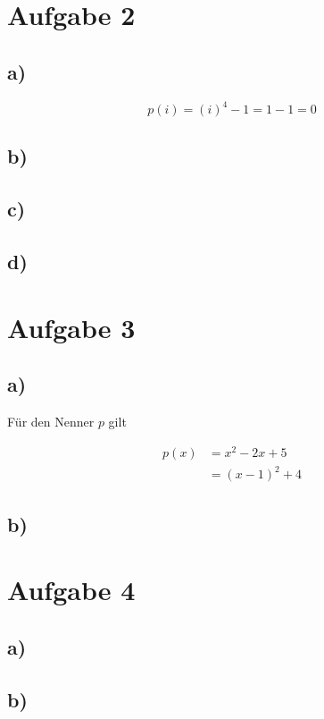 \documentclass[a4paper, 11pt]{article}
\begin{document}
\section{Aufgabe 2}
\label{sec:org6c29b4d}
\subsection{a)}
\label{sec:orgfdda429}
$$ p(i) = (i)^4 - 1 = 1 - 1 = 0 $$

\subsection{b)}
\label{sec:org3399f55}
\subsection{c)}
\label{sec:org8afed2c}
\subsection{d)}
\label{sec:org7aca756}
\section{Aufgabe 3}
\label{sec:orgfc378cb}
\subsection{a)}
\label{sec:orgb618ef2}
Für den Nenner \(p\) gilt

\begin{align*}
    p(x) &= x^2 - 2x + 5 \\
    &= (x - 1)^2 + 4
\end{align*}

\subsection{b)}
\label{sec:org99d67d4}
\section{Aufgabe 4}
\label{sec:orgc010df0}
\subsection{a)}
\label{sec:orgdcdcd08}
\subsection{b)}
\label{sec:org161f3f9}
\end{document}
